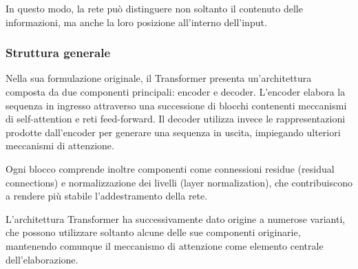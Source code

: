 In questo modo, la rete può distinguere non soltanto il contenuto delle informazioni, ma anche la loro posizione all'interno dell'input.

\subsubsection{Struttura generale}

Nella sua formulazione originale, il Transformer presenta un'architettura composta da due componenti principali: encoder e decoder. L'encoder elabora la sequenza in ingresso attraverso una successione di blocchi contenenti meccanismi di self-attention e reti feed-forward. Il decoder utilizza invece le rappresentazioni prodotte dall'encoder per generare una sequenza in uscita, impiegando ulteriori meccanismi di attenzione.

Ogni blocco comprende inoltre componenti come connessioni residue (residual connections) e normalizzazione dei livelli (layer normalization), che contribuiscono a rendere più stabile l'addestramento della rete.

L'architettura Transformer ha successivamente dato origine a numerose varianti, che possono utilizzare soltanto alcune delle sue componenti originarie, mantenendo comunque il meccanismo di attenzione come elemento centrale dell'elaborazione.